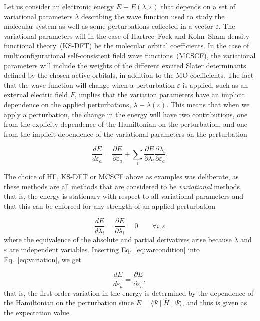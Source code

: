 \documentclass[%
 reprint,
 amsmath,amssymb,
 aps,
]{revtex4-1}
\begin{document}
Let us consider an electronic energy $E\equiv
E\left(\lambda,\varepsilon\right)$ that depends on a set of variational
parameters $\lambda$ describing the wave function used to study the molecular
system as well as some perturbations collected in a vector $\varepsilon$. The
variational parameters will in the case of Hartree--Fock and Kohn--Sham
density-functional theory~(KS-DFT) be the molecular orbital coefficients. In
the case of multiconfigurational self-consistent field wave functions~(MCSCF),
the variational parameters will include the weights of the different excited
Slater determinants defined by the chosen active orbitals, in addition to the
MO coefficients. The fact that the wave function will change when a
perturbation $\varepsilon$ is applied, such as an external electric field $F$,
implies that the variation parameters have an implicit dependence on the
applied perturbations, $\lambda\equiv \lambda\left(\varepsilon\right)$. This
means that when we apply a perturbation, the change in the energy will have two
contributions, one from the explicity dependence of the Hamiltonian on the
perturbation, and one from the implicit dependence of the variational
parameters on the perturbation

\begin{equation}
\frac{dE}{d\varepsilon_a} = \frac{\partial E}{\partial\varepsilon_a} + \sum_i
\frac{\partial
  E}{\partial\lambda_i}\frac{\partial\lambda_i}{\partial\varepsilon_a}.
\label{eq:variation}
\end{equation}

The choice of HF, KS-DFT or MCSCF above as examples was deliberate, as these
methods are all methods that are considered to be {\em variational\/} methods,
that is, the energy is stationary with respect to all variational parameters
and that this can be enforced for any strength of an applied perturbation

\begin{equation}
\frac{dE}{d\lambda_i} = \frac{\partial E}{\partial\lambda_i} =
0\qquad\forall i, \varepsilon
\label{eq:varcondition}
\end{equation}
where the equivalence of the absolute and partial derivatives arise because
$\lambda$ and $\varepsilon$ are independent variables. Inserting
Eq.~\eqref{eq:varcondition} into Eq.~\eqref{eq:variation}, we get

\begin{equation}
\frac{dE}{d\varepsilon_a} = \frac{\partial E}{\partial\varepsilon_a},
\end{equation}
that is, the first-order variation in the energy is determined by the
dependence of the Hamiltonian on the perturbation since
$E=\langle\Psi\mid\hat{H}\mid\Psi\rangle$, and thus is given as the expectation
value
\end{document}
